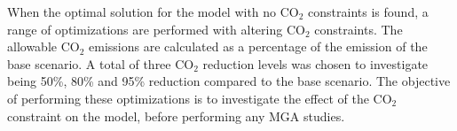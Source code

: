 When the optimal solution for the model with no $\text{CO}_2$ constraints is found, a range of optimizations are performed with altering $\text{CO}_2$ constraints. The allowable $\text{CO}_2$ emissions are calculated as a percentage of the emission of the base scenario. A total of three $\text{CO}_2$ reduction levels was chosen to investigate being 50\%, 80\% and 95\% reduction compared to the base scenario. The objective of performing these optimizations is to investigate the effect of the $\text{CO}_2$ constraint on the model, before performing any MGA studies. 


